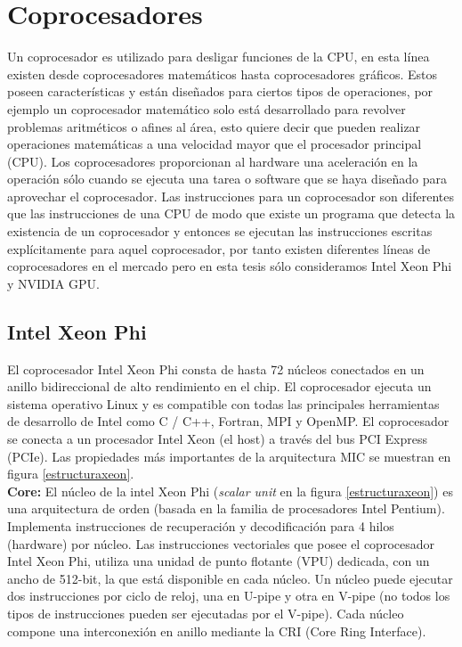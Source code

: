 \section{Coprocesadores} \label{cap:coprocesadores}

Un coprocesador es utilizado para desligar funciones de la CPU, en esta línea existen desde coprocesadores matemáticos hasta coprocesadores gráficos. Estos poseen características y están diseñados para ciertos tipos de operaciones, por ejemplo un coprocesador matemático solo está desarrollado para revolver problemas aritméticos o afines al área, esto quiere decir que pueden realizar operaciones matemáticas a una velocidad mayor que el procesador principal (CPU). Los coprocesadores proporcionan al hardware una aceleración en la operación sólo cuando se ejecuta una tarea o software que se haya diseñado para aprovechar el coprocesador. Las instrucciones para un coprocesador son diferentes que las instrucciones de una CPU de modo que existe un programa que detecta la existencia de un coprocesador y entonces se ejecutan las instrucciones escritas explícitamente para aquel coprocesador, por tanto existen diferentes líneas de coprocesadores en el mercado pero en esta tesis sólo consideramos Intel Xeon Phi y NVIDIA GPU.

\subsection{Intel Xeon Phi}

El coprocesador Intel Xeon Phi \cite{xeonphi1} \cite{wange2014} \cite{xeonphila} consta de hasta 72 núcleos conectados en un anillo bidireccional de alto rendimiento en el chip. El coprocesador ejecuta un sistema operativo Linux y es compatible con todas las principales herramientas de desarrollo de Intel como C / C++, Fortran, MPI y OpenMP. El coprocesador se conecta a un procesador Intel Xeon (el host) a través del bus PCI Express (PCIe). Las propiedades más importantes de la arquitectura MIC se muestran en figura \ref{estructuraxeon}.\\

\textbf{Core:} El núcleo de la intel Xeon Phi (\textit{scalar unit} en la figura \ref{estructuraxeon}) es una arquitectura de orden (basada en la familia de procesadores Intel Pentium). Implementa instrucciones de recuperación y decodificación para 4 hilos (hardware) por núcleo. Las instrucciones vectoriales que posee el coprocesador Intel Xeon Phi, utiliza una unidad de punto flotante (VPU) dedicada, con un ancho de 512-bit, la que está disponible en cada núcleo. Un núcleo puede ejecutar dos instrucciones por ciclo de reloj, una en U-pipe y otra en V-pipe (no todos los tipos de instrucciones pueden ser ejecutadas por el V-pipe). Cada núcleo compone una interconexión en anillo mediante la CRI (Core Ring Interface).\\

